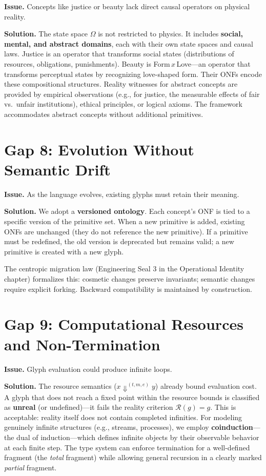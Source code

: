 \documentclass[12pt, letterpaper]{book}
\def\otimes{x}%
\def\mathfrak#1{#1}%
\begin{document}
\textbf{Issue.} Concepts like justice or beauty lack direct causal operators on physical reality.

\textbf{Solution.} The state space $\Omega$ is not restricted to physics. It includes \textbf{social, mental, and abstract domains}, each with their own state spaces and causal laws. Justice is an operator that transforms social states (distributions of resources, obligations, punishments). Beauty is Form$\,\otimes\,$Love---an operator that transforms perceptual states by recognizing love-shaped form. Their ONFs encode these compositional structures. Reality witnesses for abstract concepts are provided by empirical observations (e.g., for justice, the measurable effects of fair vs.\ unfair institutions), ethical principles, or logical axioms. The framework accommodates abstract concepts without additional primitives.

\section{Gap 8: Evolution Without Semantic Drift}

\textbf{Issue.} As the language evolves, existing glyphs must retain their meaning.

\textbf{Solution.} We adopt a \textbf{versioned ontology}. Each concept's ONF is tied to a specific version of the primitive set. When a new primitive is added, existing ONFs are unchanged (they do not reference the new primitive). If a primitive must be redefined, the old version is deprecated but remains valid; a new primitive is created with a new glyph.

The centropic migration law (Engineering Seal 3 in the Operational Identity chapter) formalizes this: cosmetic changes preserve invariants; semantic changes require explicit forking. Backward compatibility is maintained by construction.

\section[Gap 9: Computational Resources]{Gap 9: Computational Resources\\ and Non-Termination}

\textbf{Issue.} Glyph evaluation could produce infinite loops.

\textbf{Solution.} The resource semantics ($x \Downarrow^{(t,m,e)} y$) already bound evaluation cost. A glyph that does not reach a fixed point within the resource bounds is classified as \textbf{unreal} (or undefined)---it fails the reality criterion $\mathcal{R}(\mathfrak{g}) = \mathfrak{g}$. This is acceptable: reality itself does not contain completed infinities. For modeling genuinely infinite structures (e.g., streams, processes), we employ \textbf{coinduction}---the dual of induction---which defines infinite objects by their observable behavior at each finite step. The type system can enforce termination for a well-defined fragment (the \textit{total} fragment) while allowing general recursion in a clearly marked \textit{partial} fragment.
\end{document}
